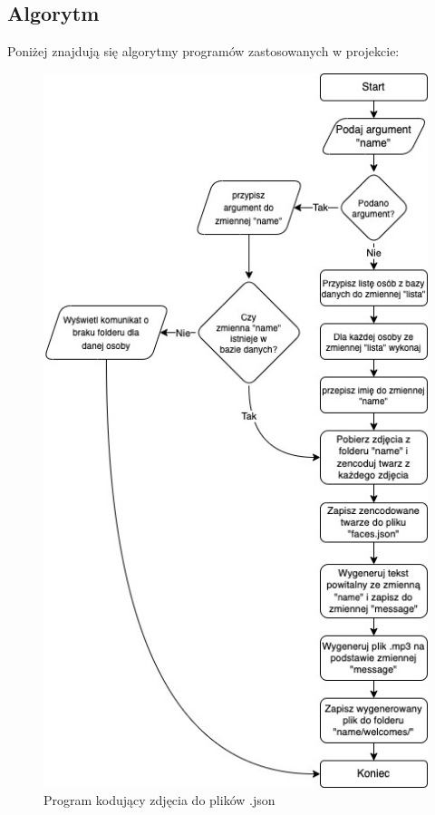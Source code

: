 \documentclass[a4paper,12pt,reqno]{article}
\begin{document}
\newpage
\subsection{Algorytm}
Poniżej znajdują się algorytmy programów zastosowanych w projekcie:

\begin{figure}[H]%
\centering
\includegraphics[width=0.7\columnwidth]{imgs/generujacy.drawio.jpg}
\caption{Program kodujący zdjęcia do plików .json \label{algorytm_encode_faces}}
\quad
\end{figure}
\end{document}
